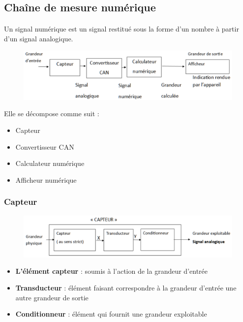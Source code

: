 \documentclass{article}
\begin{document}
\subsection{Chaîne de mesure numérique}
\paragraph{}
Un signal numérique est un signal restitué sous la forme d'un nombre à partir d'un signal analogique.

\begin{figure}[H]
    \centering
    \includegraphics[width=0.9\linewidth]{images/chaine-mesure-numerique.png}    
\end{figure}

Elle se décompose comme suit :
\begin{itemize}
    \item Capteur
    \item Convertisseur CAN
    \item Calculateur numérique
    \item Afficheur numérique
\end{itemize}

\subsubsection{Capteur}

\begin{figure}[H]
    \centering
    \includegraphics[width=0.9\linewidth]{images/capteur.png}    
\end{figure}

\begin{itemize}
    \item \textbf{L'élément capteur} : soumis à l'action de la grandeur d'entrée
    \item \textbf{Transducteur} : élément faisant correspondre à la grandeur d'entrée une autre grandeur de sortie
    \item \textbf{Conditionneur} : élément qui fournit une grandeur exploitable
\end{itemize}
\end{document}
